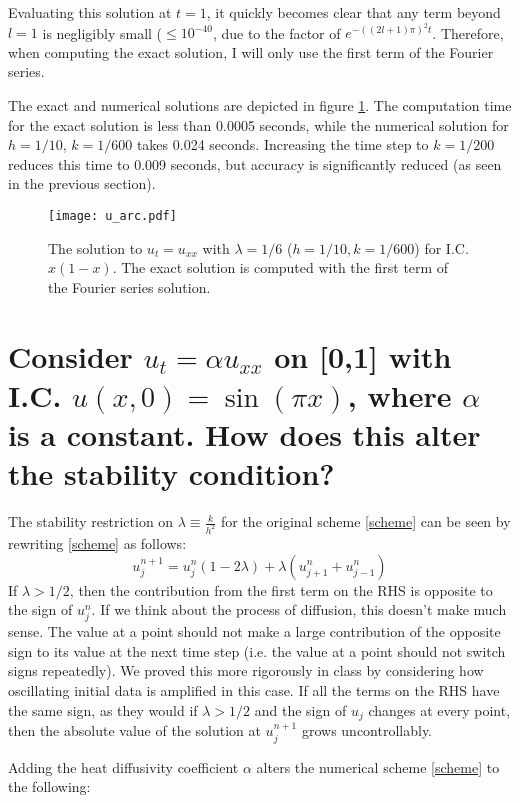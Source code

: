 \documentclass[11pt]{amsart}
\begin{document}
 Evaluating this solution at $t=1$, it quickly becomes clear that any term beyond $l=1$ is negligibly small ($\le 10^{-40}$, due to the factor of  $e^{-((2l+1)\pi)^2 t}$.  Therefore, when computing the exact solution, I will only use the first term of the Fourier series. 
 
 The exact and numerical solutions are depicted in figure \ref{uarc}.  The computation time for the exact solution is less than 0.0005 seconds, while the numerical solution for $h=1/10$, $k=1/600$ takes 0.024 seconds. Increasing the time step to $k=1/200$ reduces this time to 0.009 seconds, but accuracy is significantly reduced (as seen in the previous section). 
 \begin{figure}[t]
\begin{center} 
\texttt{[image: u\_arc.pdf]}
\caption{The solution to $u_t = u_{xx}$ with  $\lambda =1/6$ ($h=1/10 , k = 1/600$) for I.C. $x(1-x)$. The exact solution is computed with the first  term of the Fourier series solution.  }
\label{uarc} 
\end{center}
\end{figure}
 
\section{Consider $u_t = \alpha u_{xx}$ on [0,1] with I.C. $u(x,0)= \sin(\pi x)$, where $\alpha$ is a constant. How does this alter the stability condition? }
The stability restriction on $\lambda \equiv \frac{k}{h^2}$ for the original scheme \eqref{scheme} can be seen by rewriting \eqref{scheme} as follows: 
\begin{equation} 
u_j^{n+1} = u_j^n(1-2\lambda ) + \lambda(u_{j+1}^n + u_{j-1}^n)
\end{equation} 
If $\lambda > 1/2$, then the contribution from the first term on the RHS is opposite to the sign of $u_j^n$. If we think about the process of diffusion, this doesn't make much sense. The value at a point should not  make a large contribution of the opposite sign to its value at the next time step (i.e. the value at a point should not switch signs repeatedly). We proved this more rigorously in class by considering how oscillating initial data is amplified in this case. If all the terms on the RHS have the same sign,  as they would if $\lambda >1/2$ and the sign of $u_j$ changes at every point, then the absolute value  of the solution at $u_j^{n+1}$ grows uncontrollably. 

Adding the heat diffusivity coefficient $\alpha$ alters the numerical scheme \eqref{scheme} to the following: 
\end{document}
